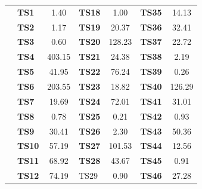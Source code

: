 \begin{table}[]
{\begin{tabular}{|l|l|S[table-format=3.2]|l|S[table-format=3.2]|l|S[table-format=3.2]|}
			& \textbf{TS1}       & 1.40                            & \textbf{TS18}      & 1.00                           & \textbf{TS35}      & 14.13                          \\  
			& \textbf{TS2}       & 1.17                            & \textbf{TS19}      & 20.37                          & \textbf{TS36}      & 32.41                          \\  
			& \textbf{TS3}       & 0.60                            & \textbf{TS20}      & 128.23                         & \textbf{TS37}      & 22.72                          \\  
			& \textbf{TS4}       & 403.15  & \textbf{TS21}      & 24.38                          & \textbf{TS38}      & 2.19                           \\  
			& \textbf{TS5}       & 41.95                           & \textbf{TS22}      & 76.24                          & \textbf{TS39}      & 0.26                           \\  
			& \textbf{TS6}       & 203.55                          & \textbf{TS23}      & 18.82                          & \textbf{TS40}      & 126.29                         \\  
			& \textbf{TS7}       & 19.69                           & \textbf{TS24}      & 72.01                          & \textbf{TS41}      & 31.01                          \\  
			& \textbf{TS8}       & 0.78                            & \textbf{TS25}      & 0.21                           & \textbf{TS42}      & 0.93                           \\  
			& \textbf{TS9}       & 30.41                           & \textbf{TS26}      & 2.30                           & \textbf{TS43}      & 50.36                          \\  
			& \textbf{TS10}      & 57.19                           & \textbf{TS27}      & 101.53                         & \textbf{TS44}      & 12.56                          \\  
			& \textbf{TS11}      & 68.92                           & \textbf{TS28}      & 43.67                          & \textbf{TS45}      & 0.91                           \\  
			& \textbf{TS12}      & 74.19                           & TS29               & 0.90                           & \textbf{TS46}      & 27.28                          \\  

\end{tabular}}
\end{table}
